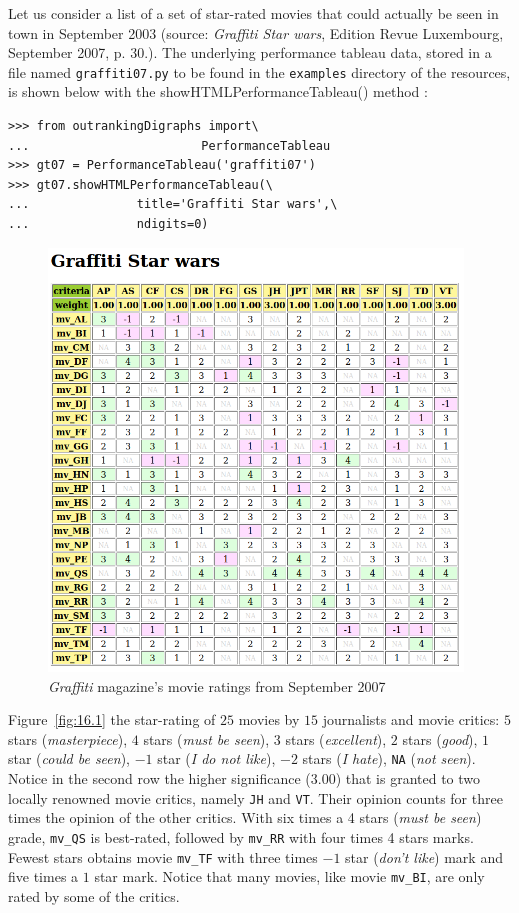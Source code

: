 Let us consider a list of a set of star-rated movies that could actually be seen in town in September 2003 (source: \emph{Graffiti Star wars}, Edition Revue Luxembourg, September 2007, p. 30.). The underlying performance tableau data, stored in a file named \texttt{graffiti07.py} to be found in the \texttt{examples} directory of the \Digraph resources, is shown below with the showHTMLPerformanceTableau() method  : 
\begin{lstlisting}
>>> from outrankingDigraphs import\
...                        PerformanceTableau 
>>> gt07 = PerformanceTableau('graffiti07')
>>> gt07.showHTMLPerformanceTableau(\
...               title='Graffiti Star wars',\
...               ndigits=0)
\end{lstlisting}
\begin{figure}[h]
\includegraphics[width=11cm]{Figures/graffiti07_1.png}
\caption{\emph{Graffiti} magazine's movie ratings from September 2007}
\label{fig:16.1}       %
\end{figure}

Figure~\vref{fig:16.1} the star-rating of $25$ movies by $15$ journalists and movie critics: $5$ stars (\emph{masterpiece}), $4$ stars (\emph{must be seen}), $3$ stars (\emph{excellent}), $2$ stars (\emph{good}), $1$ star (\emph{could be seen}), $-1$ star (\emph{I do not like}), $-2$ stars (\emph{I hate}), \texttt{NA} (\emph{not seen}). Notice in the second row the higher significance ($3.00$) that is granted to two locally renowned movie critics, namely \texttt{JH} and \texttt{VT}. Their opinion counts for three times the opinion of the other critics. With six times a 4 stars (\emph{must be seen}) grade, \texttt{mv\_QS} is best-rated, followed by \texttt{mv\_RR} with four times 4 stars marks. Fewest stars obtains movie \texttt{mv\_TF} with three times $-1$ star (\emph{don't like}) mark and five times a $1$ star mark. Notice that many movies, like movie \texttt{mv\_BI}, are only rated by some of the critics. 

